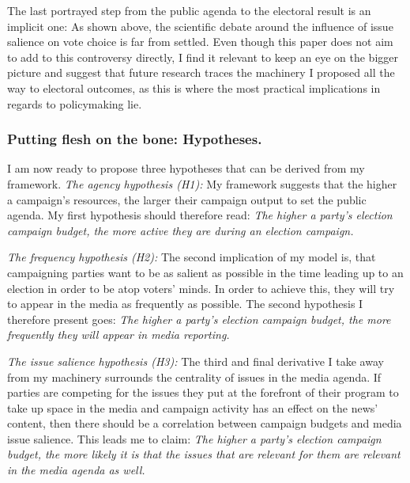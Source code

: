 \documentclass[11pt,a4paper]{article}
\begin{document}
The last portrayed step from the public agenda to the electoral result is an implicit one: As shown above, the scientific debate around the influence of issue salience on vote choice is far from settled. Even though this paper does not aim to add to this controversy directly, I find it relevant to keep an eye on the bigger picture and suggest that future research traces the machinery I proposed all the way to electoral outcomes, as this is where the most practical implications in regards to policymaking lie.


\subsubsection{Putting flesh on the bone: Hypotheses.}
I am now ready to propose three hypotheses that can be derived from my framework.
\textit{The agency hypothesis (H1):} My framework suggests that the higher a campaign’s resources, the larger their campaign output to set the public agenda. My first hypothesis should therefore read: \textit{The higher a party’s election campaign budget, the more active they are during an election campaign.}

\textit{The frequency hypothesis (H2):} The second implication of my model is, that campaigning parties want to be as salient as possible in the time leading up to an election in order to be atop voters’ minds. In order to achieve this, they will try to appear in the media as frequently as possible. The second hypothesis I therefore present goes: \textit{The higher a party’s election campaign budget, the more frequently they will appear in media reporting.}

\textit{The issue salience hypothesis (H3):} The third and final derivative I take away from my machinery surrounds the centrality of issues in the media agenda. If parties are competing for the issues they put at the forefront of their program to take up space in the media and campaign activity has an effect on the news’ content, then there should be a correlation between campaign budgets and media issue salience. This leads me to claim: \textit{The higher a party’s election campaign budget, the more likely it is that the issues that are relevant for them are relevant in the media agenda as well.}
\end{document}
